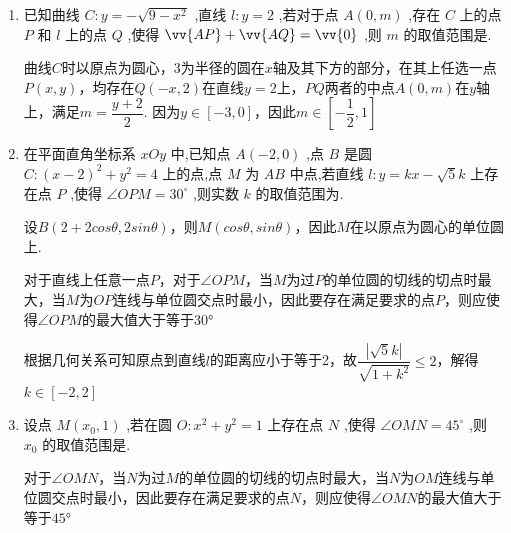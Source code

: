 \begin{enumerate}
    \item 已知曲线 $C : y =  - \sqrt{9 - {x}^{2}}$ ,直线 $l : y = 2$ ,若对于点 $A\left( {0,m}\right)$ ,存在 $C$ 上的点 $P$ 和 $l$ 上的点 $Q$ ,使得 $\vv{AP} + \vv{AQ} = \vv{0}$ ,则 $m$ 的取值范围是.
    \begin{jieda}
        曲线$C$时以原点为圆心，3为半径的圆在$x$轴及其下方的部分，在其上任选一点$P(x, y)$，均存在$Q(-x, 2)$在直线$y = 2$上，$PQ$两者的中点$A(0, m)$在$y$轴上，满足$m = \dfrac{y+2}{2}$. 因为$y \in [-3, 0]$，因此$m \in \left[-\dfrac{1}{2}, 1\right]$
    \end{jieda}
    \item 在平面直角坐标系 ${xOy}$ 中,已知点 $A\left( {-2,0}\right)$ ,点 $B$ 是圆 $C : {\left( x - 2\right) }^{2} + {y}^{2} = 4$ 上的点,点 $M$ 为 ${AB}$ 中点,若直线 $l : y = {kx} - \sqrt{5}k$ 上存在点 $P$ ,使得 $\angle {OPM} = {30}^{ \circ  }$ ,则实数 $k$ 的取值范围为\blkda{$[-2, 2]$}.
    \begin{jieda}
        设$B(2+2cos\theta, 2sin\theta)$，则$M(cos\theta, sin\theta)$，因此$M$在以原点为圆心的单位圆上.

        对于直线上任意一点$P$，对于$\angle{OPM}$，当$M$为过$P$的单位圆的切线的切点时最大，当$M$为$OP$连线与单位圆交点时最小，因此要存在满足要求的点$P$，则应使得$\angle{OPM}$的最大值大于等于$\ang{30}$

        根据几何关系可知原点到直线$l$的距离应小于等于2，故$\dfrac{|\sqrt{5}k|}{\sqrt{1+k^2}} \leq 2$，解得$k \in [-2, 2]$
    \end{jieda}
    \item 设点 $M\left( {{x}_{0},1}\right)$ ,若在圆 $O : {x}^{2} + {y}^{2} = 1$ 上存在点 $N$ ,使得 $\angle {OMN} = {45}^{ \circ  }$ ,则 ${x}_{0}$ 的取值范围是\blkda{$[-1, 1]$}.
    \begin{jieda}
        对于$\angle{OMN}$，当$N$为过$M$的单位圆的切线的切点时最大，当$N$为$OM$连线与单位圆交点时最小，因此要存在满足要求的点$N$，则应使得$\angle{OMN}$的最大值大于等于$\ang{45}$


\end{jieda}
\end{enumerate}

